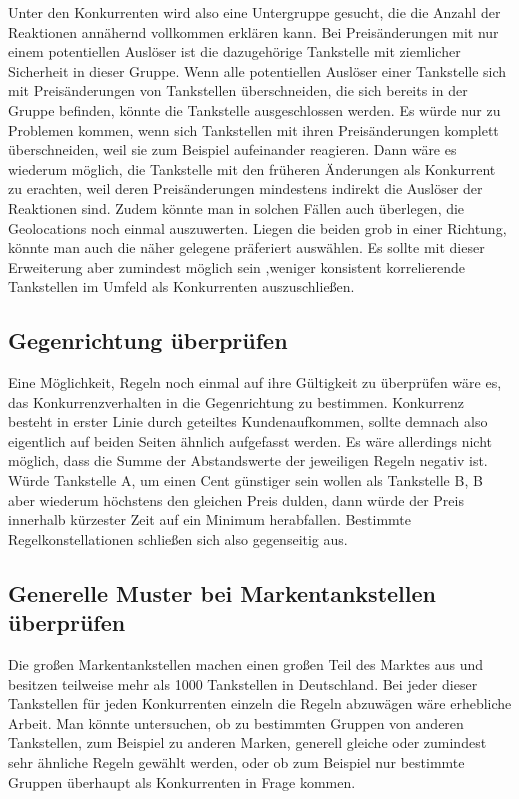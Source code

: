 Unter den Konkurrenten wird also eine Untergruppe gesucht, die die Anzahl der Reaktionen annähernd vollkommen erklären kann. Bei Preisänderungen mit nur einem potentiellen Auslöser ist die dazugehörige Tankstelle mit ziemlicher Sicherheit in dieser Gruppe. Wenn alle potentiellen Auslöser einer Tankstelle sich mit Preisänderungen von Tankstellen überschneiden, die sich bereits in der Gruppe befinden, könnte die Tankstelle ausgeschlossen werden. Es würde nur zu Problemen kommen, wenn sich Tankstellen mit ihren Preisänderungen komplett überschneiden, weil sie zum Beispiel aufeinander reagieren. Dann wäre es wiederum möglich, die Tankstelle mit den früheren Änderungen als Konkurrent zu erachten, weil deren Preisänderungen mindestens indirekt die Auslöser der Reaktionen sind. Zudem könnte man in solchen Fällen auch überlegen, die Geolocations noch einmal auszuwerten. Liegen die beiden grob in einer Richtung, könnte man auch die näher gelegene präferiert auswählen. Es sollte mit dieser Erweiterung aber zumindest möglich sein ,weniger konsistent korrelierende Tankstellen im Umfeld als Konkurrenten auszuschließen. 

\subsection{Gegenrichtung überprüfen}
Eine Möglichkeit, Regeln noch einmal auf ihre Gültigkeit zu überprüfen wäre es, das Konkurrenzverhalten in die Gegenrichtung zu bestimmen. Konkurrenz besteht in erster Linie durch geteiltes Kundenaufkommen, sollte demnach also eigentlich auf beiden Seiten ähnlich aufgefasst werden. Es wäre allerdings nicht möglich, dass die Summe der Abstandswerte der jeweiligen Regeln negativ ist. Würde Tankstelle A, um einen Cent günstiger sein wollen als Tankstelle B, B aber wiederum höchstens den gleichen Preis dulden, dann würde der Preis innerhalb kürzester Zeit auf ein Minimum herabfallen. Bestimmte Regelkonstellationen schließen sich also gegenseitig aus.

\subsection{Generelle Muster bei Markentankstellen überprüfen}
Die großen Markentankstellen machen einen großen Teil des Marktes aus und besitzen teilweise mehr als 1000 Tankstellen in Deutschland. Bei jeder dieser Tankstellen für jeden Konkurrenten einzeln die Regeln abzuwägen wäre erhebliche Arbeit. Man könnte untersuchen, ob zu bestimmten Gruppen von anderen Tankstellen, zum Beispiel zu anderen Marken, generell gleiche oder zumindest sehr ähnliche Regeln gewählt werden, oder ob zum Beispiel nur bestimmte Gruppen überhaupt als Konkurrenten in Frage kommen.


